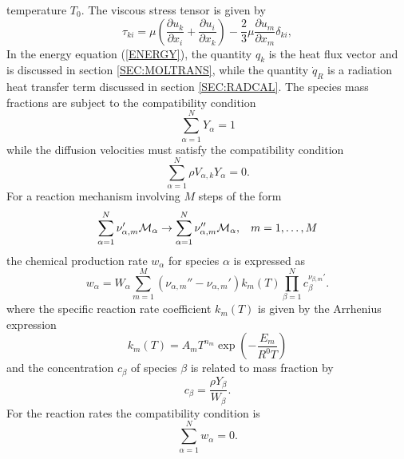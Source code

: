 \documentclass[dvips]{article}
\begin{document}
temperature $T_{0}$.  The viscous stress tensor is given by
\begin{equation}
\tau_{ki} = \mu\left(\frac{\partial u_{k}}{\partial x_{i}} +
\frac{\partial u_{i}}{\partial x_{k}}\right) -
\frac{2}{3}\mu\frac{\partial u_{m}}{\partial x_{m}}\delta_{ki},
\label{VISCSTRESS}
\end{equation}
In the energy equation (\ref{ENERGY}), the quantity $q_{k}$ is the heat flux
vector and is discussed in section \ref{SEC:MOLTRANS}, while the quantity
$\dot{q}_{R}$ is a radiation heat transfer term discussed in section
\ref{SEC:RADCAL}.
The species mass fractions are subject to the compatibility condition
\begin{equation}
\sum_{\alpha=1}^{N}Y_{\alpha} = 1
\label{COMPATY}
\end{equation}
while the diffusion velocities must satisfy the compatibility condition
\begin{equation}
\sum_{\alpha=1}^{N}\rho V_{\alpha,k}Y_{\alpha} = 0.
\label{COMPATV}
\end{equation}
For a reaction mechanism involving $M$ steps of the form
\begin{equation}
\sum_{\alpha=1}^{N}\nu_{\alpha,m}'{\cal M}_{\alpha} \rightarrow
\sum_{\alpha=1}^{N}\nu_{\alpha,m}''{\cal M}_{\alpha},\hspace{3mm} m=1,\ldots,M
\end{equation}
the chemical production rate $w_{\alpha}$ for species $\alpha$ is expressed as
\begin{equation}
w_{\alpha} = W_{\alpha}
\sum_{m=1}^{M}\left(\nu_{\alpha,m}''-\nu_{\alpha,m}'\right)k_{m}(T)
\prod_{\beta=1}^{N}c_{\beta}^{\nu_{\beta,m}'}.
\label{RRATE}
\end{equation}
where the specific reaction rate coefficient $k_{m}(T)$ is given by
the Arrhenius expression 
\begin{equation}
k_{m}(T) = A_{m}T^{n_{m}}\exp{\left(-\frac{E_{m}}{R^{0}T}\right)}
\label{KRATE}
\end{equation}
and the concentration $c_{\beta}$ of species $\beta$ is related to
mass fraction by
\begin{equation}
c_{\beta} = \frac{\rho Y_{\beta}}{W_{\beta}}.
\label{CONCDEF}
\end{equation}
For the reaction rates the compatibility condition is
\begin{equation}
\sum_{\alpha=1}^{N}w_{\alpha} = 0.
\label{COMPATW}
\end{equation}
\end{document}
